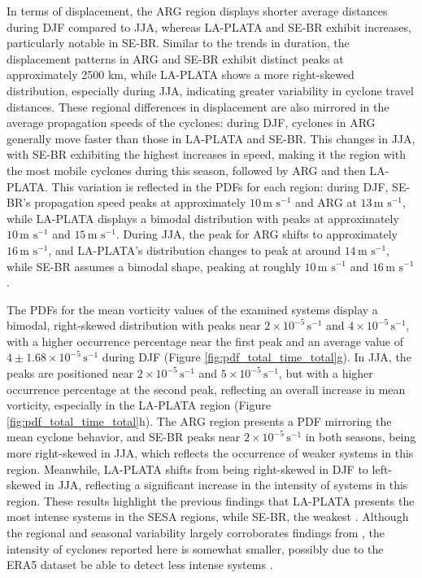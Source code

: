 In terms of displacement, the ARG region displays shorter average distances during DJF compared to JJA, whereas LA-PLATA and SE-BR exhibit increases, particularly notable in SE-BR. Similar to the trends in duration, the displacement patterns in ARG and SE-BR exhibit distinct peaks at approximately 2500 km, while LA-PLATA shows a more right-skewed distribution, especially during JJA, indicating greater variability in cyclone travel distances. These regional differences in displacement are also mirrored in the average propagation speeds of the cyclones: during DJF, cyclones in ARG generally move faster than those in LA-PLATA and SE-BR. This changes in JJA, with SE-BR exhibiting the highest increases in speed, making it the region with the most mobile cyclones during this season, followed by ARG and then LA-PLATA. This variation is reflected in the PDFs for each region: during DJF, SE-BR's propagation speed peaks at approximately \(10 \, \text{m s}^{-1}\) and ARG at \(13 \, \text{m s}^{-1}\), while LA-PLATA displays a bimodal distribution with peaks at approximately \(10 \, \text{m s}^{-1}\) and \(15 \, \text{m s}^{-1}\). During JJA, the peak for ARG shifts to approximately \(16 \, \text{m s}^{-1}\), and LA-PLATA's distribution changes to peak at around \(14 \, \text{m s}^{-1}\), while SE-BR assumes a bimodal shape, peaking at roughly \(10 \, \text{m s}^{-1}\) and \(16 \, \text{m s}^{-1}\).

The PDFs for the mean vorticity values of the examined systems display a bimodal, right-skewed distribution with peaks near \(2 \times 10^{-5} \, \text{s}^{-1}\) and \(4 \times 10^{-5} \, \text{s}^{-1}\), with a higher occurrence percentage near the first peak and an average value of \(4 \pm 1.68 \times 10^{-5} \, \text{s}^{-1}\) during DJF (Figure \ref{fig:pdf_total_time_total}g). In JJA, the peaks are positioned near \(2 \times 10^{-5} \, \text{s}^{-1}\) and \(5 \times 10^{-5} \, \text{s}^{-1}\), but with a higher occurrence percentage at the second peak, reflecting an overall increase in mean vorticity, especially in the LA-PLATA region (Figure \ref{fig:pdf_total_time_total}h). The ARG region presents a PDF mirroring the mean cyclone behavior, and SE-BR peaks near \(2 \times 10^{-5} \, \text{s}^{-1}\) in both seasons, being more right-skewed in JJA, which reflects the occurrence of weaker systems in this region. Meanwhile, LA-PLATA shifts from being right-skewed in DJF to left-skewed in JJA, reflecting a significant increase in the intensity of systems in this region. These results highlight the previous findings that LA-PLATA presents the most intense systems in the SESA regions, while SE-BR, the weakest \citep{simmonds2000mean, reboita2010south, gramcianinov2019properties}. Although the regional and seasonal variability largely corroborates findings from \citet{gramcianinov2019properties}, the intensity of cyclones reported here is somewhat smaller, possibly due to the ERA5 dataset be able to detect less intense systems \citep{gramcianinov2020analysis}.

